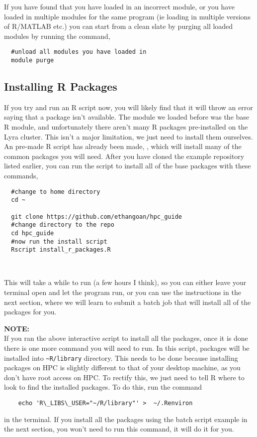 If you have found that you have loaded in an incorrect module, or you have loaded in multiple modules for the same program (ie loading in multiple versions of R/MATLAB etc.) you can start from a clean slate by purging all loaded modules by running the command,
%
\\
\par
\begin{verbatim}
  #unload all modules you have loaded in
  module purge
\end{verbatim}
% 
\subsection{Installing R Packages}
\label{sec:install}
If you try and run an R script now, you will likely find that it will throw an error saying that a package isn't available. The module we loaded before was the base R module, and unfortunately there aren't many R packages pre-installed on the Lyra cluster. This isn't a major limitation, we just need to install them ourselves. An pre-made R script has already been made, , which will install many of the common packages you will need. After you have cloned the example repository listed earlier, you can run the script to install all of the base packages with these commands,
\\
\par
\begin{verbatim}
  #change to home directory
  cd ~
  
  git clone https://github.com/ethangoan/hpc_guide  
  #change directory to the repo
  cd hpc_guide
  #now run the install script
  Rscript install_r_packages.R
\end{verbatim}
%
\\
\par
% 
This will take a while to run (a few hours I think), so you can either leave your terminal open and let the program run, or you can use the instructions in the next section, where we will learn to submit a batch job that will install all of the packages for you.
%
\begin{story}
  \textbf{NOTE:}
  \\
  If you ran the above interactive script to install all the packages, once it is done there is one more command you will need to run. In this script, packages will be installed into \texttt{\textasciitilde R/library} directory. This needs to be done because installing packages on HPC is slightly different to that of your desktop machine, as you don't have root access on HPC. To rectify this, we just need to tell R where to look to find the installed packages. To do this, run the command
  \\
  \begin{verbatim}
    echo 'R\_LIBS\_USER="~/R/library"' >  ~/.Renviron
  \end{verbatim}
  in the terminal. If you install all the packages using the batch script example in the next section, you won't need to run this command, it will do it for you.
\end{story}
